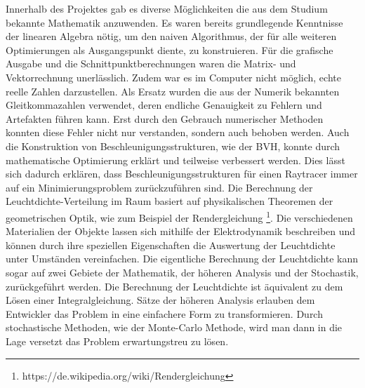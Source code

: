 \documentclass[crop=false]{standalone}
\begin{document}
    Innerhalb des Projektes gab es diverse Möglichkeiten die aus dem Studium bekannte Mathematik anzuwenden.
    Es waren bereits grundlegende Kenntnisse der linearen Algebra nötig, um den naiven Algorithmus, der für alle weiteren Optimierungen als Ausgangspunkt diente, zu konstruieren.
    Für die grafische Ausgabe und die Schnittpunktberechnungen waren die Matrix- und Vektorrechnung unerlässlich.
    Zudem war es im Computer nicht möglich, echte reelle Zahlen darzustellen.
    Als Ersatz wurden die aus der Numerik bekannten Gleitkommazahlen verwendet, deren endliche Genauigkeit zu Fehlern und Artefakten führen kann.
    Erst durch den Gebrauch numerischer Methoden konnten diese Fehler nicht nur verstanden, sondern auch behoben werden.
    Auch die Konstruktion von Beschleunigungsstrukturen, wie der BVH, konnte durch mathematische Optimierung erklärt und teilweise verbessert werden.
    Dies lässt sich dadurch erklären, dass Beschleunigungsstrukturen für einen Raytracer immer auf ein Minimierungsproblem zurückzuführen sind.
    Die Berechnung der Leuchtdichte-Verteilung im Raum basiert auf physikalischen Theoremen der geometrischen Optik, wie zum Beispiel der Rendergleichung%
    \footnote{https://de.wikipedia.org/wiki/Rendergleichung}.
    Die verschiedenen Materialien der Objekte lassen sich mithilfe der Elektrodynamik beschreiben und können durch ihre speziellen Eigenschaften die Auswertung der Leuchtdichte unter Umständen vereinfachen.
    Die eigentliche Berechnung der Leuchtdichte kann sogar auf zwei Gebiete der Mathematik, der höheren Analysis und der Stochastik, zurückgeführt werden.
    Die Berechnung der Leuchtdichte ist äquivalent zu dem Lösen einer Integralgleichung.
    Sätze der höheren Analysis erlauben dem Entwickler das Problem in eine einfachere Form zu transformieren.
    Durch stochastische Methoden, wie der Monte-Carlo Methode, wird man dann in die Lage versetzt das Problem erwartungstreu zu lösen.
\end{document}
